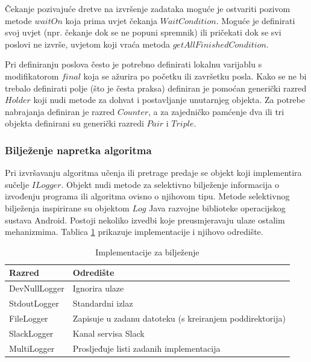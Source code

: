 \documentclass[times, utf8, numeric, diplomski]{fer}
\begin{document}
Čekanje pozivajuće dretve na izvršenje zadataka moguće je ostvariti pozivom metode $waitOn$ koja prima uvjet čekanja $WaitCondition$. Moguće je definirati svoj uvjet (npr. čekanje dok se ne popuni spremnik) ili pričekati dok se svi poslovi ne izvrše, uvjetom koji vraća metoda $getAllFinishedCondition$.

Pri definiranju poslova često je potrebno definirati lokalnu varijablu s modifikatorom $final$ koja se ažurira po početku ili završetku posla. Kako se ne bi trebalo definirati polje (što je česta praksa) definiran je pomoćan generički razred $Holder$ koji nudi metode za dohvat i postavljanje unutarnjeg objekta. Za potrebe nabrajanja definiran je razred $Counter$, a za zajedničko pamćenje dva ili tri objekta definirani su generički razredi $Pair$ i $Triple$.

\subsubsection{Bilježenje napretka algoritma}

%

Pri izvršavanju algoritma učenja ili pretrage predaje se objekt koji implementira sučelje $ILogger$. Objekt nudi metode za selektivno bilježenje informacija o izvođenju programa ili algoritma ovisno o njihovom tipu. Metode selektivnog bilježenja inspirirane su objektom $Log$ Java razvojne biblioteke operacijskog sustava Android. Postoji nekoliko izvedbi koje preusmjeravaju ulaze ostalim mehanizmima. Tablica \ref{tab:loggers} prikazuje implementacije i njihovo odredište.

\begin{table}[h]
\begin{tabular}{ll}
Razred & Odredište \\
\hline
DevNullLogger & Ignorira ulaze \\
StdoutLogger & Standardni izlaz \\
FileLogger & Zapisuje u zadanu datoteku (s kreiranjem poddirektorija) \\
SlackLogger & Kanal servisa Slack \\
MultiLogger & Prosljeđuje listi zadanih implementacija
\end{tabular}
\centering
\caption{Implementacije za bilježenje}
\label{tab:loggers}
\end{table}
\end{document}
